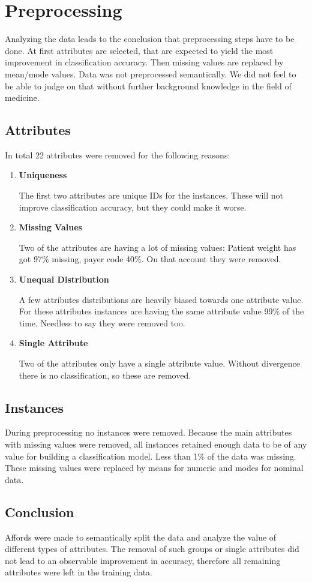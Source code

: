 \section{Preprocessing}

Analyzing the data leads to the conclusion that preprocessing steps have to be done. At first attributes are selected,
 that are expected to yield the most improvement in classification accuracy. Then missing values are replaced by 
 mean/mode values. Data was not preprocessed semantically. We did not feel to be able to judge on that without further 
 background knowledge in the field of medicine.
\subsection{Attributes}

In total 22 attributes were removed for the following reasons:

\begin{enumerate}
\item \textbf{Uniqueness}

The first two attributes are unique IDs for the instances. These will not improve classification accuracy, but they 
could make it worse.

\item \textbf{Missing Values}

Two of the attributes are having a lot of missing values: Patient weight has got 97\% missing, payer code 40\%. On that 
account they were removed.

\item \textbf{Unequal Distribution}

A few attributes distributions are heavily biased towards one attribute value. For these attributes instances are having
the same attribute value 99\% of the time. Needless to say they were removed too.

\item \textbf{Single Attribute}

Two of the attributes only have a single attribute value. Without divergence there is no classification, so these are 
removed.
\end{enumerate}

\subsection{Instances}

During preprocessing no instances were removed. Because the main attributes with missing values were removed, all 
instances retained enough data to be of any value for building a classification model. Less than 1\% of the data was 
missing. These missing values were replaced by means for numeric and modes for nominal data.


\subsection{Conclusion}

Affords were made to semantically split the data and analyze the value of different types of attributes. The removal of 
such groups or single attributes did not lead to an observable improvement in accuracy, therefore all remaining 
attributes were left in the training data.